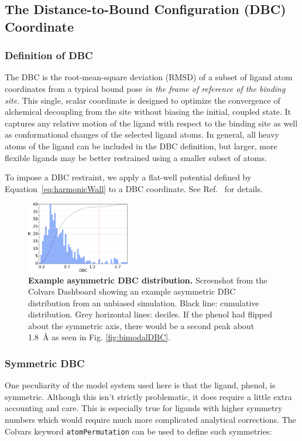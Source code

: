 \documentclass[9pt,tutorial,pubversion]{Styling/livecoms}
\begin{document}
\subsection{The Distance-to-Bound Configuration (DBC) Coordinate}
\subsubsection{Definition of DBC}
The DBC is the root-mean-square deviation (RMSD) of a subset of ligand atom coordinates from a typical bound pose \textit{in the frame of reference of the binding site}.
This single, scalar coordinate is designed to optimize the convergence of alchemical decoupling from the site without biasing the initial, coupled state.
It captures any relative motion of the ligand with respect to the binding site as well as conformational changes of the selected ligand atoms.
In general, all heavy atoms of the ligand can be included in the DBC definition, but larger, more flexible ligands may be better restrained using a smaller subset of atoms.

To impose a DBC restraint, we apply a flat-well potential defined by Equation~\ref{eq:harmonicWall} to a DBC coordinate.
See Ref.~ for details.
\begin{figure}[!htb]
    \centering
\includegraphics[width=0.4\textwidth]{histogram.png} 
    \caption{\textbf{Example asymmetric DBC distribution.} Screenshot from the Colvars Dashboard showing an example asymmetric DBC distribution from an unbiased simulation. Black line: cumulative distribution. Grey horizontal lines: deciles. If the phenol had flipped about the symmetric axis, there would be a second peak about 1.8~\AA{} as seen in Fig. \ref{fig:bimodalDBC}.}
\label{step:DBCwidth}
\end{figure}


\subsubsection{Symmetric DBC}
\label{app:Symmetry}

One peculiarity of the model system used here is that the ligand, phenol, is symmetric. 
Although this isn't strictly problematic, it does require a little extra accounting and care. 
This is especially true for ligands with higher symmetry numbers which would require much more complicated analytical corrections. 
The Colvars keyword \texttt{atomPermutation} can be used to define such symmetries:
\end{document}

